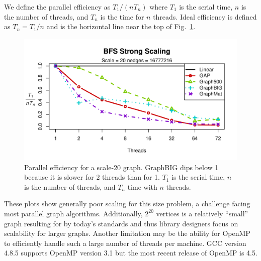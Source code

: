 \documentclass[conference]{IEEEtran}
\begin{document}
We define the parallel efficiency as $T_1 / (n T_n)$ where $T_1$ is the serial time, $n$ is the number of threads, and $T_n$ is the time for $n$ threads. Ideal efficiency is defined as $T_n = T_1/n$ and is the horizontal line near the top of Fig.~\ref{fig:bfs-efficiency}. 
\begin{figure}[htb]
	\centering
		\includegraphics[width=\linewidth, trim=0 18pt 18pt 12pt, clip]{graphics/bfs_ss20.pdf}
	\caption{Parallel efficiency for a scale-20 graph. GraphBIG dips below 1 because it is slower for $2$ threads than for 1. $T_1$ is the serial time, $n$ is the number of threads, and $T_n$ time with $n$ threads.}
	\label{fig:bfs-efficiency}
\end{figure}

These plots show generally poor scaling for this size problem, a challenge facing most parallel graph algorithms. 
Additionally, $2^{20}$ vertices is a relatively ``small'' graph resulting for by today's standards and thus library designers focus on scalability for larger graphs. Another limitation may be the ability for OpenMP to efficiently handle such a large number of threads per machine. GCC version 4.8.5 supports OpenMP version 3.1 but the most recent release of OpenMP is 4.5.
\end{document}
